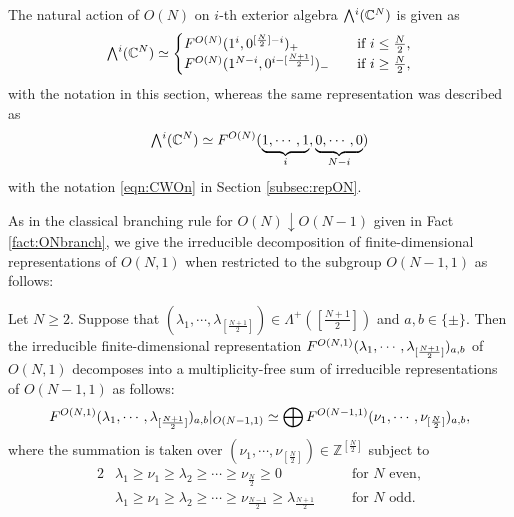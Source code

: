 \begin{example}
\label{ex:exteriorpm}
The natural action of $O(N)$
 on $i$-th exterior algebra
 $\Exterior^i({\mathbb{C}}^N)$ is given as 
\[
\Exterior^i({\mathbb{C}}^N)
\simeq
\begin{cases}
\Kirredrep {O(N)}{1^i, 0^{[\frac N 2]-i}}_{+}
\quad
&\text{if } i \le \frac N 2, 
\\
\Kirredrep {O(N)}{1^{N-i}, 0^{i-[\frac {N+1} 2]}}_{-}
\quad
&\text{if } i \ge \frac N 2, 
\end{cases}
\]
with the notation
 in this section,
 whereas the same representation was described as 
\[
    \Exterior^i({\mathbb{C}}^N)
    \simeq
    \Kirredrep {O(N)}{\underbrace{1,\cdots,1}_{i}, \underbrace{0,\cdots,0}_{N-i}}
\]
with the notation \eqref{eqn:CWOn}
 in Section \ref{subsec:repON}.  
\end{example}
As in the classical branching rule for $O(N) \downarrow O(N-1)$
 given in Fact \ref{fact:ONbranch}, 
 we give the irreducible decomposition of finite-dimensional representations
 of $O(N,1)$
 when restricted to the subgroup $O(N-1,1)$
 as follows:
\begin{theorem}
\label{thm:ON1branch}
Let $N \ge 2$.  
Suppose that $(\lambda_1, \cdots,\lambda_{[\frac{N+1}2]})
 \in \Lambda^+([\frac{N+1}2])$
 and $a,b \in \{\pm\}$.  
Then the irreducible finite-dimensional representation
 $F^{{O(N,1)}}({\lambda_1, \cdots,\lambda_{[\frac{N+1}2]}})_{a, b}$
  of $O(N,1)$ decomposes
 into a multiplicity-free sum
 of irreducible representations
 of $O(N-1,1)$ as follows:
\begin{equation*}
   F^{{O(N,1)}}({\lambda_1, \cdots,\lambda_{[\frac{N+1}2]}})_{a, b}|_{O(N-1,1)}
   \simeq
  \bigoplus
   F^{{O(N-1,1)}}({\nu_1, \cdots, \nu_{[\frac{N}{2}]}})_{a, b}, 
\end{equation*}
where the summation is taken over
 $(\nu_1, \cdots, \nu_{[\frac{N}{2}]}) \in {\mathbb{Z}}^{[\frac N 2]}$
 subject to 
\begin{alignat*}{2}
&\lambda_{1} \ge \nu_{1} \ge \lambda_{2} \ge \cdots \ge \nu_{\frac N 2} \ge 0
\quad
&&\text{for $N$ even}, 
\\
&\lambda_{1} \ge \nu_{1} \ge \lambda_{2} \ge \cdots \ge \nu_{\frac {N-1} 2}
\ge \lambda_{\frac {N+1} 2}
\quad
&&\text{for $N$ odd}.   
\end{alignat*} 
\end{theorem}

